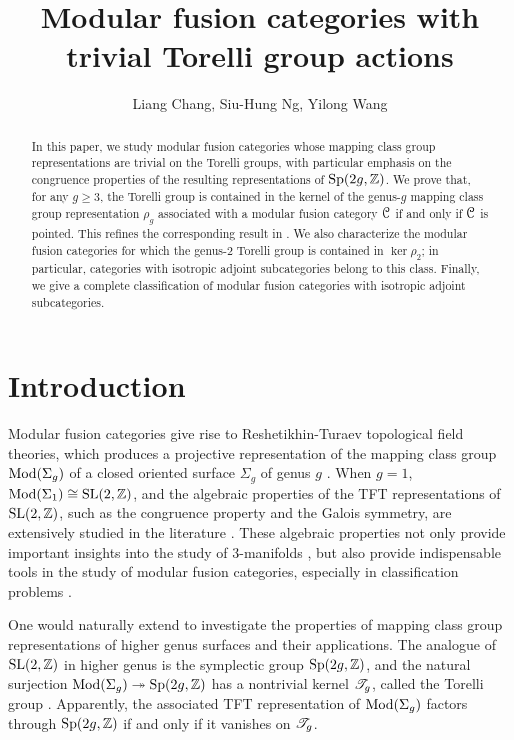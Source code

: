 \documentclass[11pt]{article}
\title{\textbf{Modular fusion categories with trivial Torelli group actions}}
\author{Liang Chang, Siu-Hung Ng, Yilong Wang}
\date{}
\begin{document}
\maketitle

\begin{abstract}
In this paper, we study modular fusion categories whose mapping class group representations are trivial on the Torelli groups, with particular emphasis on the congruence properties of the resulting representations of ${\operatorname{Sp}}(2g,{\mathbb{Z}})$. We prove that, for any $g \ge 3$, the Torelli group is contained in the kernel of the genus-$g$ mapping class group representation $\rho_g$ associated with a modular fusion category ${\mathcal{C}}$ if and only if ${\mathcal{C}}$ is pointed. This refines the corresponding result in \cite{MW25}. We also characterize the modular fusion categories for which the genus-$2$ Torelli group is contained in $\ker \rho_2$; in particular, categories with isotropic adjoint subcategories belong to this class. Finally, we give a complete classification of modular fusion categories with isotropic adjoint subcategories.
\end{abstract}
\tableofcontents
\section{Introduction}
Modular fusion categories give rise to Reshetikhin-Turaev topological  field theories, which produces a projective representation of the mapping class group $\operatorname{Mod}(\Sigma_{g})$ of a closed oriented surface $\Sigma_{g}$ of genus $g$ \cite{Tur10}. When $g=1$, $\operatorname{Mod}(\Sigma_{1}) \cong {\operatorname{SL}}(2, {\mathbb{Z}})$, and the algebraic properties of the TFT representations of ${\operatorname{SL}}(2,{\mathbb{Z}})$, such as the congruence property and the Galois symmetry, are extensively studied in the literature \cite{dBG, CG94, SZ12, NS10, DLN15}. These algebraic properties not only provide important insights into the study of 3-manifolds \cite{Fun13}, but also provide indispensable tools in the study of modular fusion categories, especially in  classification problems \cite{Rank5, NWZ-trans}. 

One would naturally extend to investigate the properties of mapping class group representations of higher genus surfaces and their applications. The analogue of ${\operatorname{SL}}(2,{\mathbb{Z}})$ in higher genus is the symplectic group ${\operatorname{Sp}}(2g, {\mathbb{Z}})$, and the natural surjection $\operatorname{Mod}(\Sigma_{g})\twoheadrightarrow{\operatorname{Sp}}(2g, {\mathbb{Z}})$ has a nontrivial kernel $\mathscr{T}_{g}$, called the Torelli group \cite{FM12}. Apparently, the associated TFT representation of $\operatorname{Mod}(\Sigma_{g})$ factors through ${\operatorname{Sp}}(2g, {\mathbb{Z}})$ if and only if it vanishes on $\mathscr{T}_{g}$. 
\end{document}
